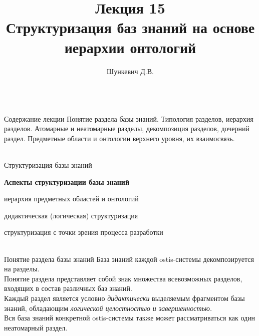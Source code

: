 \title{Лекция 15\\Структуризация баз знаний на основе иерархии онтологий}
\author[]{Шункевич Д.В.}

\begin{frame}
	\titlepage
\end{frame}

\begin{frame}{\\Содержание лекции}
	\topline
	\justifying
	Понятие раздела базы знаний. Типология разделов, иерархия разделов. Атомарные и неатомарные разделы, декомпозиция разделов, дочерний раздел. Предметные области и онтологии верхнего уровня, их взаимосвязь.
\end{frame}

\begin{frame}{\\Структуризация базы знаний}
	\topline
	\justifying
	\begin{SCn}
		\textbf{Аспекты структуризации базы знаний}
		\begin{textitemize}
			\item  иерархия предметных областей и онтологий
			\item дидактическая (логическая) структуризация
			\item структуризация с точки зрения процесса разработки
		\end{textitemize}
	\end{SCn}
\end{frame}

\begin{frame}{\\Понятие раздела базы знаний}
	\topline
	\justifying
	База знаний каждой ostis-системы декомпозируется на разделы.\\
	Понятие раздела представляет собой знак	множества всевозможных разделов, входящих в	состав различных баз знаний. \\ \vspace{10mm}
	Каждый раздел является условно \textit{дидактически} выделяемым	фрагментом базы знаний, обладающим \textit{логической	целостностью и завершенностью.}\\
	Вся база знаний	конкретной ostis-системы также может	рассматриваться как один неатомарный раздел.
\end{frame}


